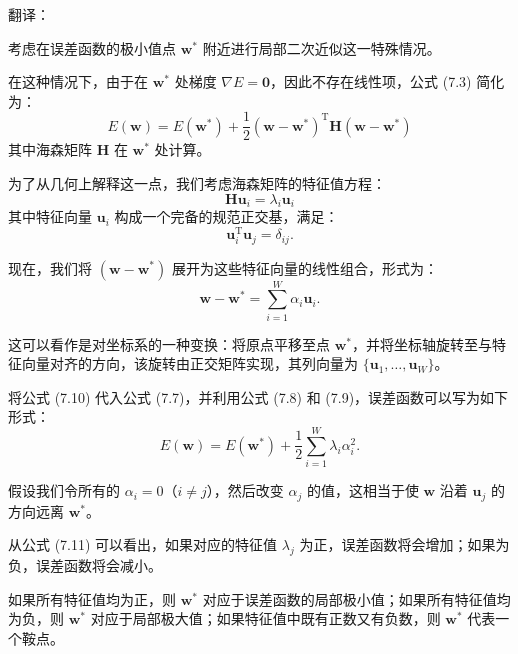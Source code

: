 \documentclass{article}
\begin{document}
{\color{red}
翻译：

考虑在误差函数的极小值点 $\mathbf{w}^*$ 附近进行局部二次近似这一特殊情况。

在这种情况下，由于在 $\mathbf{w}^*$ 处梯度 $\nabla E = \mathbf{0}$，因此不存在线性项，公式 (7.3) 简化为：
\begin{equation}
E(\mathbf{w}) = E(\mathbf{w}^*) + \frac{1}{2} (\mathbf{w} - \mathbf{w}^*)^\mathrm{T} \mathbf{H} (\mathbf{w} - \mathbf{w}^*)
\tag{7.7}
\end{equation}
其中海森矩阵 $\mathbf{H}$ 在 $\mathbf{w}^*$ 处计算。

为了从几何上解释这一点，我们考虑海森矩阵的特征值方程：
\begin{equation}
\mathbf{H} \mathbf{u}_i = \lambda_i \mathbf{u}_i
\tag{7.8}
\end{equation}
其中特征向量 $\mathbf{u}_i$ 构成一个完备的规范正交基，满足：
\begin{equation}
\mathbf{u}_i^\mathrm{T} \mathbf{u}_j = \delta_{ij}.
\tag{7.9}
\end{equation}

现在，我们将 $(\mathbf{w} - \mathbf{w}^*)$ 展开为这些特征向量的线性组合，形式为：
\begin{equation}
\mathbf{w} - \mathbf{w}^* = \sum_{i=1}^{W} \alpha_i \mathbf{u}_i.
\tag{7.10}
\end{equation}

这可以看作是对坐标系的一种变换：将原点平移至点 $\mathbf{w}^*$，并将坐标轴旋转至与特征向量对齐的方向，该旋转由正交矩阵实现，其列向量为 $\{\mathbf{u}_1,\dots,\mathbf{u}_W\}$。

将公式 (7.10) 代入公式 (7.7)，并利用公式 (7.8) 和 (7.9)，误差函数可以写为如下形式：
\begin{equation}
E(\mathbf{w}) = E(\mathbf{w}^*) + \frac{1}{2} \sum_{i=1}^{W} \lambda_i \alpha_i^2.
\tag{7.11}
\end{equation}

假设我们令所有的 $\alpha_i = 0$（$i \ne j$），然后改变 $\alpha_j$ 的值，这相当于使 $\mathbf{w}$ 沿着 $\mathbf{u}_j$ 的方向远离 $\mathbf{w}^*$。

从公式 (7.11) 可以看出，如果对应的特征值 $\lambda_j$ 为正，误差函数将会增加；如果为负，误差函数将会减小。

如果所有特征值均为正，则 $\mathbf{w}^*$ 对应于误差函数的局部极小值；如果所有特征值均为负，则 $\mathbf{w}^*$ 对应于局部极大值；如果特征值中既有正数又有负数，则 $\mathbf{w}^*$ 代表一个鞍点。
}
\end{document}
